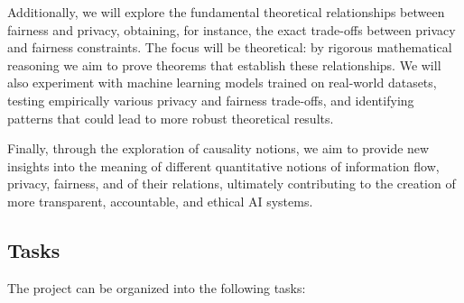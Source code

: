 \documentclass[12pt]{article}
\begin{document}
Additionally, we will explore the fundamental theoretical relationships between fairness and privacy, obtaining, for instance, the exact trade-offs between privacy and fairness constraints. The focus will be theoretical: by rigorous mathematical reasoning we aim to prove theorems that establish these relationships. We will also experiment with machine learning models trained on real-world datasets, testing empirically various privacy and fairness trade-offs, and identifying patterns that could lead to more robust theoretical results.

Finally, through the exploration of causality notions\cite{Causality}, we aim to provide new insights into the meaning of different quantitative notions of information flow, privacy, fairness, and of their relations, ultimately contributing to the creation of more transparent, accountable, and ethical AI systems.

\subsection{Tasks}
The project can be organized into the following tasks:
\end{document}
